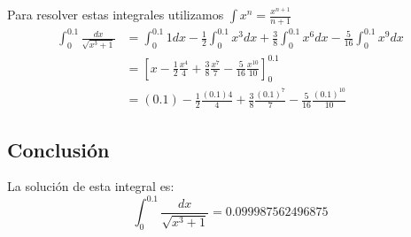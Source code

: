         Para resolver estas integrales utilizamos $ \int x^n = \frac{x^{n+1}}{n+1} $
        \begin{align}
            \int_0^{0.1} \frac{dx}{\sqrt{x^3 + 1}} & = \int_0^{0.1} 1 dx -  \frac{1}{2} \int_0^{0.1} x^3 dx + \frac{3}{8} \int_0^{0.1} x^6 dx 
            - \frac{5}{16} \int_0^{0.1} x^9 dx \\
            & = \left[x -  \frac{1}{2} \frac{x^4}{4} + \frac{3}{8} \frac{x^7}{7} -  \frac{5}{16}  \frac{x^{10}}{10} \right]_0^{0.1} \\
            & = (0.1) -  \frac{1}{2} \frac{(0.1)4}{4} + \frac{3}{8} \frac{(0.1)^7}{7} -  \frac{5}{16}  \frac{(0.1)^{10}}{10}
        \label{eq:sol6p}
        \end{align}

\subsection*{Conclusión}
    La solución de esta integral es:
    \begin{equation*}
        \boxed{\int_0^{0.1} \frac{dx}{\sqrt{x^3 + 1}} = 0.099987562496875}
    \end{equation*}